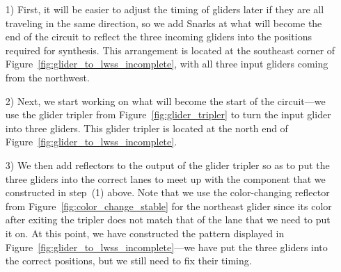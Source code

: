 \begin{itemize}
	\item[1)] First, it will be easier to adjust the timing of gliders later if they are all traveling in the same direction, so we add Snarks at what will become the end of the circuit to reflect the three incoming gliders into the positions required for synthesis. This arrangement is located at the southeast corner of Figure~\ref{fig:glider_to_lwss_incomplete}, with all three input gliders coming from the northwest.\smallskip
	
	\item[2)] Next, we start working on what will become the start of the circuit---we use the glider tripler from Figure~\ref{fig:glider_tripler} to turn the input glider into three gliders. This glider tripler is located at the north end of Figure~\ref{fig:glider_to_lwss_incomplete}.\smallskip
	
	\item[3)] We then add reflectors to the output of the glider tripler so as to put the three gliders into the correct lanes to meet up with the component that we constructed in step~(1) above. Note that we use the color-changing reflector from Figure~\ref{fig:color_change_stable} for the northeast glider since its color after exiting the tripler does not match that of the lane that we need to put it on. At this point, we have constructed the pattern displayed in Figure~\ref{fig:glider_to_lwss_incomplete}---we have put the three gliders into the correct positions, but we still need to fix their timing.\smallskip
	

\end{itemize}
